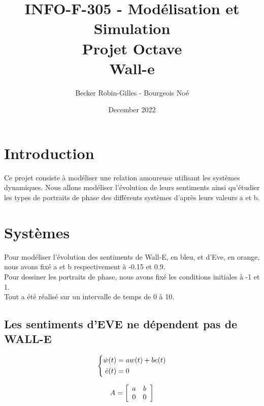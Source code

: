 \documentclass[utf8]{article}
\title{INFO-F-305 - Modélisation et Simulation
\\Projet Octave
\\Wall-e}
\author{Becker Robin-Gilles - Bourgeois Noé}
\date{December 2022}
\begin{document}
\maketitle
\tableofcontents

\newpage


\section{Introduction}
Ce projet consiste à modéliser une relation amoureuse utilisant les systèmes dynamiques. Nous allons modéliser l'évolution de leurs sentiments ainsi qu'étudier les types de portraits de phase des différents systèmes d'après leurs valeurs a et b.

\section{Systèmes}

Pour modéliser l'évolution des sentiments de Wall-E, en bleu, et d'Eve, en orange, nous avons fixé a et b respectivement à -0.15 et 0.9.
\\
Pour dessiner les portraits de phase, nous avons fixé les conditions initiales à -1 et 1.
\\
Tout a été réalisé sur un intervalle de temps de 0 à 10.


\subsection{Les sentiments d’EVE ne dépendent pas de WALL-E}

\begin{equation}
\centering
\left\{\begin{split}
\dot{w}(t) &= aw(t) + be(t)\\
\dot{e}(t) &= 0 \\
\end{split}\right.
 \end{equation}

\begin{equation}
\centering
A = \left[
\begin{array}{cc}
a & b\\
0 & 0
\end{array}
\right]
 \end{equation}
\end{document}
